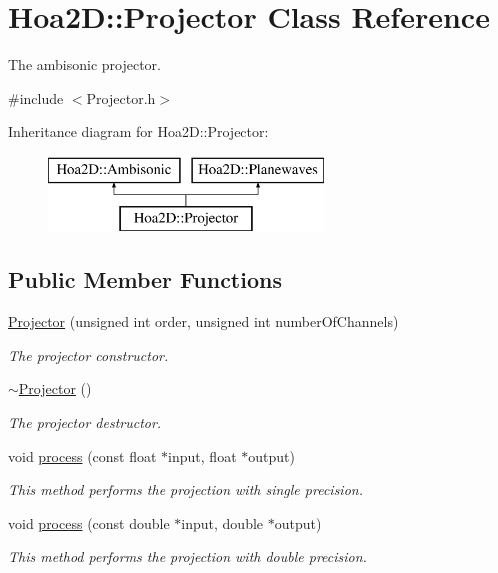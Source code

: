 \hypertarget{class_hoa2_d_1_1_projector}{\section{Hoa2\-D\-:\-:Projector Class Reference}
\label{class_hoa2_d_1_1_projector}
}


The ambisonic projector.  




{\ttfamily \#include $<$Projector.\-h$>$}

Inheritance diagram for Hoa2\-D\-:\-:Projector\-:\begin{figure}[H]
\begin{center}
\leavevmode
\includegraphics[height=2.000000cm]{class_hoa2_d_1_1_projector}
\end{center}
\end{figure}
\subsection*{Public Member Functions}
\begin{DoxyCompactItemize}
\item 
\hyperlink{class_hoa2_d_1_1_projector_a73b651a38b0680e6da45242073af54b7}{Projector} (unsigned int order, unsigned int number\-Of\-Channels)
\begin{DoxyCompactList}\small\item\em The projector constructor. \end{DoxyCompactList}\item 
\hyperlink{class_hoa2_d_1_1_projector_a7a93c4c33578b5f09636790a048c1351}{$\sim$\-Projector} ()
\begin{DoxyCompactList}\small\item\em The projector destructor. \end{DoxyCompactList}\item 
void \hyperlink{class_hoa2_d_1_1_projector_aa148fec1801404ca9114dcb074f508b5}{process} (const float $\ast$input, float $\ast$output)
\begin{DoxyCompactList}\small\item\em This method performs the projection with single precision. \end{DoxyCompactList}\item 
void \hyperlink{class_hoa2_d_1_1_projector_ada17aaf05cb2f3cc05d43bd85bfe5d99}{process} (const double $\ast$input, double $\ast$output)
\begin{DoxyCompactList}\small\item\em This method performs the projection with double precision. \end{DoxyCompactList}\end{DoxyCompactItemize}


